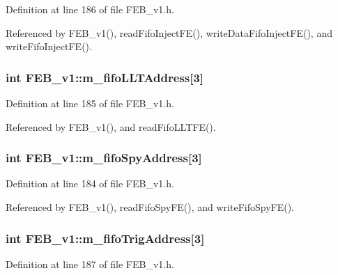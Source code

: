 Definition at line 186 of file FEB\_\-v1.h.

Referenced by FEB\_\-v1(), readFifoInjectFE(), writeDataFifoInjectFE(), and writeFifoInjectFE().\hypertarget{classFEB__v1_a68be75ba59d1c551163a9596dc1d235a}{
\subsubsection[{m\_\-fifoLLTAddress}]{\setlength{\rightskip}{0pt plus 5cm}int {\bf FEB\_\-v1::m\_\-fifoLLTAddress}\mbox{[}3\mbox{]}}}
\label{classFEB__v1_a68be75ba59d1c551163a9596dc1d235a}


Definition at line 185 of file FEB\_\-v1.h.

Referenced by FEB\_\-v1(), and readFifoLLTFE().\hypertarget{classFEB__v1_a15b48648ba4534e732376b68bddc5d34}{
\subsubsection[{m\_\-fifoSpyAddress}]{\setlength{\rightskip}{0pt plus 5cm}int {\bf FEB\_\-v1::m\_\-fifoSpyAddress}\mbox{[}3\mbox{]}}}
\label{classFEB__v1_a15b48648ba4534e732376b68bddc5d34}


Definition at line 184 of file FEB\_\-v1.h.

Referenced by FEB\_\-v1(), readFifoSpyFE(), and writeFifoSpyFE().\hypertarget{classFEB__v1_ad41f8756c4e15815c6d5e35902cf2257}{
\subsubsection[{m\_\-fifoTrigAddress}]{\setlength{\rightskip}{0pt plus 5cm}int {\bf FEB\_\-v1::m\_\-fifoTrigAddress}\mbox{[}3\mbox{]}}}
\label{classFEB__v1_ad41f8756c4e15815c6d5e35902cf2257}


Definition at line 187 of file FEB\_\-v1.h.

